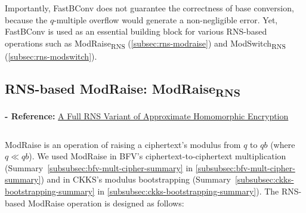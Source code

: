 \begin{myproof}
Importantly, \textsf{FastBConv} does not guarantee the correctness of base conversion, because the $q$-multiple overflow would generate a non-negligible error. Yet, \textsf{FastBConv} is used as an essential building block for various RNS-based operations such as \textsf{ModRaise\textsubscript{RNS}} (\autoref{subsec:rns-modraise}) and \textsf{ModSwitch\textsubscript{RNS}} (\autoref{subsec:rns-modswitch}).  

\end{myproof}






\subsection{RNS-based ModRaise: \textsf{ModRaise\textsubscript{RNS}}}
\label{subsec:rns-modraise}

\noindent \textbf{- Reference:} 
\href{https://eprint.iacr.org/2018/931.pdf}{A Full RNS Variant of
Approximate Homomorphic Encryption}~\cite{rns-ckks}

$ $

\textsf{ModRaise} is an operation of raising a ciphertext's modulus from $q$ to $qb$ (where $q \ll qb$). We used \textsf{ModRaise} in BFV's ciphertext-to-ciphertext multiplication (Summary~\ref*{subsubsec:bfv-mult-cipher-summary} in \autoref{subsubsec:bfv-mult-cipher-summary}) and in CKKS's modulus bootstrapping (Summary~\ref*{subsubsec:ckks-bootstrapping-summary} in \autoref{subsubsec:ckks-bootstrapping-summary}). The RNS-based \textsf{ModRaise} operation is designed as follows:


